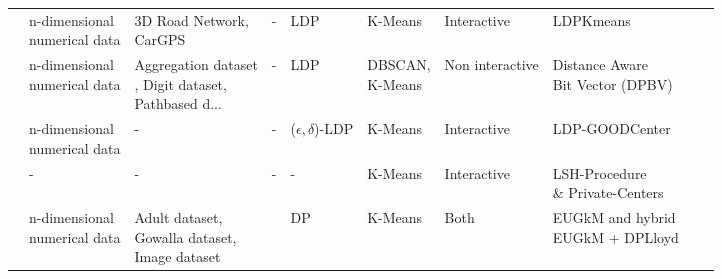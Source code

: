 \begin{landscape}
\begin{table}[ht]
\begin{threeparttable}
\begin{tabular}{rlllllllll}
        \citep{xia_distributed_2020}               & \makecell[l]{n-dimensional                                                                                                                          \\ numerical data}      & \makecell[l]{3D Road Network, \\ CarGPS}                           & -                                                  & LDP                      & K-Means             & Interactive     & LDPKmeans                        \\
        \citep{sun_distributed_2019}               & \makecell[l]{n-dimensional                                                                                                                          \\ numerical data}     & \makecell[l]{Aggregation dataset \\, Digit dataset, \\ Pathbased d...} & -                                                  & LDP                      & \makecell[l]{DBSCAN,\\  K-Means}     & Non interactive & \makecell[l]{Distance Aware \\ Bit Vector (DPBV)} \\
        \citep{nissim_clustering_2018}             & \makecell[l]{n-dimensional                                                                                                                          \\ numerical data}      & -                                                  & -                                                  & ($\epsilon, \delta$)-LDP & K-Means             & Interactive     & LDP-GOODCenter                   \\
        \citep{nissim_clustering_2018}             & -                          & -                           & -    & -                        & K-Means & Interactive     & \makecell[l]{LSH-Procedure \\ \& Private-Centers} \\
        \citep{su_differentially_2015}             & \makecell[l]{n-dimensional                                                                                                                          \\ numerical data} & \makecell[l]{Adult dataset, \\ Gowalla dataset, \\ Image dataset} & \tnote{a} & DP                       & K-Means             & Both            & \makecell[l]{EUGkM and hybrid \\ EUGkM + DPLloyd} \\

\end{tabular}
\end{threeparttable}
\end{table}
\end{landscape}
